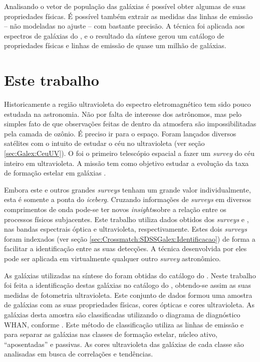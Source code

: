 Analisando o vetor de população das galáxias é possível obter algumas de suas
propriedades físicas. É possível também extrair as medidas das linhas de emissão
-- não modeladas no ajuste -- com bastante precisão. A técnica foi aplicada aos
espectros de galáxias do \SDSS, e o resultado da síntese gerou um catálogo de
propriedades físicas e linhas de emissão de quase um milhão de galáxias.



\section{Este trabalho}
\label{sec:Intro:EsteTrab}

Historicamente a região ultravioleta do espectro eletromagnético tem sido pouco
estudada na astronomia. Não por falta de interesse dos astrônomos, mas pelo
simples fato de que observações feitas de dentro da atmosfera são
impossibilitadas pela camada de ozônio. É preciso ir para o espaço. Foram
lançados diversos satélites com o intuito de estudar o céu no ultravioleta (ver
seção \ref{sec:Galex:CeuUV}). O \galex foi o primeiro telescópio espacial a
fazer um {\em survey} do céu inteiro em ultravioleta. A missão tem como objetivo
estudar a evolução da taxa de formação estelar em galáxias \citep{Martin2005}.

Embora este e outros grandes {\em surveys} tenham um grande valor
individualmente, esta é somente a ponta do {\em iceberg}. Cruzando informações
de {\em surveys} em diversos comprimentos de onda pode-se ter novos {\em
insights}\fixme sobre a relação entre os processos físicos subjacentes. Este
trabalho utiliza dados obtidos dos {\em surveys} \SDSS e \galex, nas bandas
espectrais óptica e ultravioleta, respectivamente. Estes dois {\em surveys}
foram indexados (ver seção \ref{sec:Crossmatch:SDSSGalex:Identificacao}) de
forma a facilitar a identificação entre as suas detecções. A técnica
desenvolvida por eles pode ser aplicada em virtualmente qualquer outro {\em
survey} astronômico.

As galáxias utilizadas na síntese do \starlight foram obtidas do catálogo do
\SDSS. Neste trabalho foi feita a identificação destas galáxias no catálogo do
\galex, obtendo-se assim as suas medidas de fotometria ultravioleta. Este
conjunto de dados formou uma amostra de galáxias com as suas propriedades
físicas, cores ópticas e cores ultravioleta. As galáxias desta amostra são
classificadas utilizando o diagrama de diagnóstico WHAN, conforme
\citet{CidFernandes2011}. Este método de classificação utiliza as linhas de
emissão \Halpha e \NII para separar as galáxias nas classes de formação estelar,
núcleo ativo, ``aposentadas'' e passivas. As cores ultravioleta das galáxias de
cada classe são analisadas em busca de correlações e tendências.

